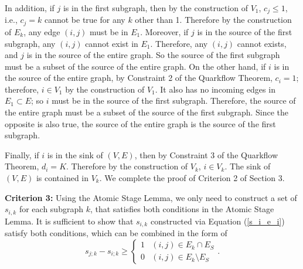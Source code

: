 \documentclass[review]{siamart0216}
\begin{document}
In addition, if $j$ is in the first subgraph, then by the
construction of $V_1$, $c_j \le 1$, i.e., $c_j = k$ cannot be true for
any $k$ other than 1.   Therefore by the construction of $E_k$, any edge
$(i,j)$ must be in $E_1$.  Moreover, if $j$ is in the source of the first
subgraph, any $(i,j)$ cannot exist in $E_1$.  Therefore, any $(i,j)$ cannot
exists, and $j$ is in the source of the entire graph.  So the source of the
first subgraph must be a subset of the source of the entire graph.
On the other hand, if $i$ is in the source of the entire graph, by Constraint
2 of the Quarkflow Theorem, $c_i=1$; therefore, $i\in V_1$ by the construction of
$V_1$.  It also has no incoming edges in $E_1\subset E$; so $i$ must be
in the source of the first subgraph.  Therefore, the source of the entire
graph must be a subset of the source of the first subgraph.  Since the opposite
is also true, the source of the entire graph is the source of the first
subgraph.

Finally, if $i$ is in the sink of $(V,E)$, then by Constraint 3 of the Quarkflow
Theorem, $d_i=K$.  Therefore by the construction of $V_k$, $i\in V_k$.
The sink of $(V,E)$ is contained in $V_k$.  We complete the proof of
Criterion 2 of Section 3.

{\bf Criterion 3:} Using the Atomic Stage Lemma, we only need to construct
a set of $s_{i,k}$ for each subgraph $k$, that satisfies both conditions
in the Atomic Stage Lemma.  It is sufficient to show that $s_{i,k}$
constructed via Equation (\ref{s_i_e_i}) satisfy both conditions, which
can be combined in the form of
$$ s_{j;k} - s_{i;k}\ge
\begin{cases}
    1 & (i,j)\in E_k \cap E_S \\
    0 & (i,j)\in E_k \setminus E_S
\end{cases}.$$
\end{document}
